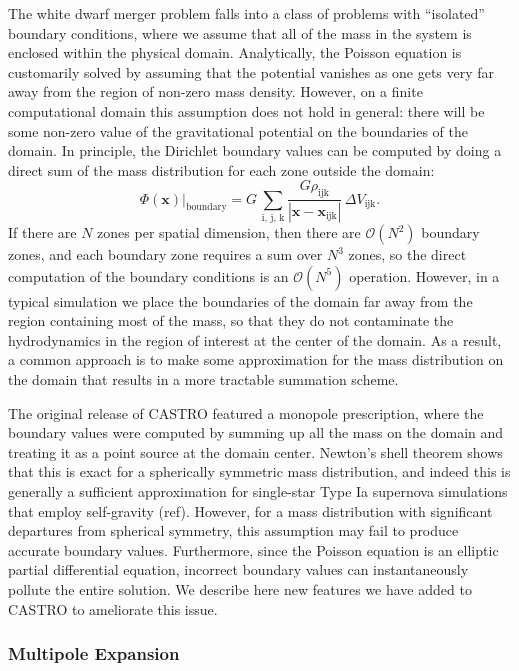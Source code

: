 \documentclass[12pt,preprint]{aastex}
\begin{document}
The white dwarf merger problem falls into a class of problems with ``isolated'' boundary conditions, where we assume that all of the mass in the system is enclosed within the physical domain. Analytically, the Poisson equation is customarily solved by assuming that the potential vanishes as one gets very far away from the region of non-zero mass density. However, on a finite computational domain this assumption does not hold in general: there will be some non-zero value of the gravitational potential on the boundaries of the domain. In principle, the Dirichlet boundary values can be computed by doing a direct sum of the mass distribution for each zone outside the domain:
\begin{equation}
  \left. \Phi(\mathbf{x}) \right|_{\text{boundary}} = G\, \sum_{\text{i, j, k}} \frac{G \rho_{\text{ijk}}}{|\mathbf{x} - \mathbf{x}_{\text{ijk}}|}\, \Delta V_{\text{ijk}}.
\end{equation}
If there are $N$ zones per spatial dimension, then there are $\mathcal{O}(N^2)$ boundary zones, and each boundary zone requires a sum over $N^3$ zones, so the direct computation of the boundary conditions is an $\mathcal{O}(N^5)$ operation. However, in a typical simulation we place the boundaries of the domain far away from the region containing most of the mass, so that they do not contaminate the hydrodynamics in the region of interest at the center of the domain. As a result, a common approach is to make some approximation for the mass distribution on the domain that results in a more tractable summation scheme. 

The original release of CASTRO featured a monopole prescription, where the boundary values were computed by summing up all the mass on the domain and treating it as a point source at the domain center. Newton's shell theorem shows that this is exact for a spherically symmetric mass distribution, and indeed this is generally a sufficient approximation for single-star Type Ia supernova simulations that employ self-gravity (ref). However, for a mass distribution with significant departures from spherical symmetry, this assumption may fail to produce accurate boundary values. Furthermore, since the Poisson equation is an elliptic partial differential equation, incorrect boundary values can instantaneously pollute the entire solution. We describe here new features we have added to CASTRO to ameliorate this issue.

\subsubsection{Multipole Expansion}
\end{document}
